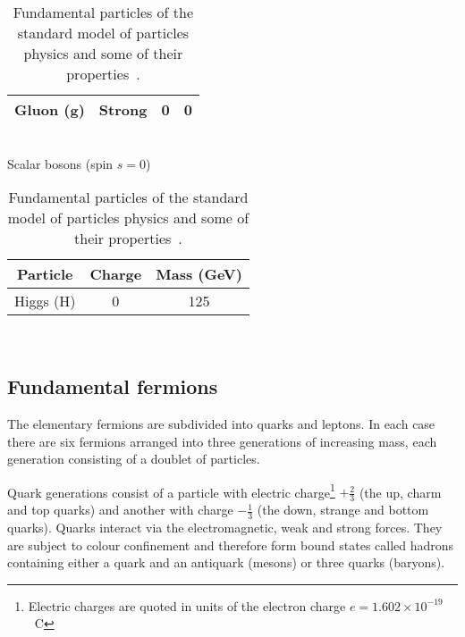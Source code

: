 \begin{table}[t]
\begin{tabular}{cccc}
Gluon (g) & Strong & 0 & 0 \\
\hline
\end{tabular} \\ \vspace{0.5cm}
Scalar bosons (spin $s=0$) \\
\begin{tabular}{ccc}
\hline
Particle & Charge & Mass (GeV) \\ \hline
Higgs (H) & 0 & 125 \\
\hline
\end{tabular} \\ \vspace{0.5cm}
\caption{Fundamental particles of the standard model of particles physics and 
some of their properties~\cite{pdg12}.}
\label{tab:sm}
\end{table}

\subsection{Fundamental fermions}
The elementary fermions are subdivided into quarks and leptons. In each case 
there are six fermions arranged into three generations of increasing mass, each 
generation consisting of a doublet of particles.

Quark generations consist of a particle with electric charge\footnote{Electric 
charges are quoted in units of the electron charge $e=1.602\times10^{-19}$~C} 
$+\frac{2}{3}$ (the up, charm and top quarks) and another with charge 
$-\frac{1}{3}$ (the down, strange and bottom quarks). Quarks interact via the 
electromagnetic, weak and strong forces. They are subject to colour confinement 
and therefore form bound states called hadrons containing either a quark and an 
antiquark (mesons) or three quarks (baryons).

